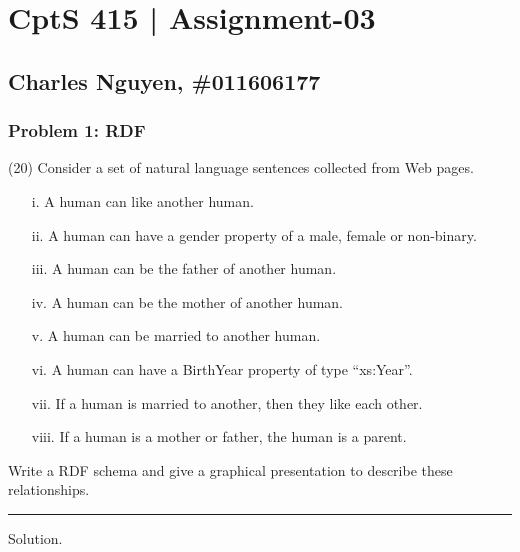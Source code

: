 \documentclass[12pt,letterpaper]{article}
\begin{document}
\section*{CptS 415 | Assignment-03 }
\subsection*{Charles Nguyen, \#011606177 }

\subsubsection*{Problem 1: \textbf{RDF}}
(20) Consider a set of natural language sentences collected from Web
pages.

\begin{enumerate}

    \item[i.] A human can like another human.

    \item[ii.] A human can have a gender property of a male, female or non-binary.

    \item[iii.] A human can be the father of another human.

    \item[iv.] A human can be the mother of another human.

    \item[v.] A human can be married to another human.

    \item[vi.] A human can have a BirthYear property of type “xs:Year”.

    \item[vii.] If a human is married to another, then they like each other.

    \item[viii.] If a human is a mother or father, the human is a parent.

\end{enumerate}

Write a RDF schema and give a graphical presentation to describe these
relationships.

\hrule

Solution.
\end{document}
